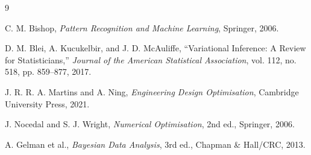 \documentclass[11pt]{article}
\begin{document}

\begin{thebibliography}{9}

C. M. Bishop, \textit{Pattern Recognition and Machine Learning}, Springer, 2006.

D. M. Blei, A. Kucukelbir, and J. D. McAuliffe, ``Variational Inference: A Review for Statisticians,'' \textit{Journal of the American Statistical Association}, vol. 112, no. 518, pp. 859--877, 2017.

J. R. R. A. Martins and A. Ning, \textit{Engineering Design Optimisation}, Cambridge University Press, 2021.

J. Nocedal and S. J. Wright, \textit{Numerical Optimisation}, 2nd ed., Springer, 2006.

A. Gelman et al., \textit{Bayesian Data Analysis}, 3rd ed., Chapman \& Hall/CRC, 2013.

\end{thebibliography}
\end{document}
